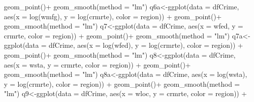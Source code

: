 \documentclass[]{article}
\newenvironment{Shaded}{}{}
\newcommand{\DataTypeTok}[1]{#1}
\newcommand{\KeywordTok}[1]{\textcolor[rgb]{0.00,0.00,1.00}{#1}}
\newcommand{\NormalTok}[1]{#1}
\newcommand{\OperatorTok}[1]{#1}
\newcommand{\StringTok}[1]{\textcolor[rgb]{0.00,0.50,0.50}{#1}}
\begin{document}
\begin{Shaded}
\begin{Highlighting}[]
\StringTok{      }\KeywordTok{geom_point}\NormalTok{()}\OperatorTok{+}
\StringTok{  }\KeywordTok{geom_smooth}\NormalTok{(}\DataTypeTok{method =} \StringTok{"lm"}\NormalTok{)}
\NormalTok{q6a<-}\KeywordTok{ggplot}\NormalTok{(}\DataTypeTok{data =}\NormalTok{ dfCrime, }\KeywordTok{aes}\NormalTok{(}\DataTypeTok{x =} \KeywordTok{log}\NormalTok{(wmfg), }\DataTypeTok{y =} \KeywordTok{log}\NormalTok{(crmrte), }\DataTypeTok{color =}\NormalTok{ region)) }\OperatorTok{+}\StringTok{ }
\StringTok{      }\KeywordTok{geom_point}\NormalTok{()}\OperatorTok{+}
\StringTok{  }\KeywordTok{geom_smooth}\NormalTok{(}\DataTypeTok{method =} \StringTok{"lm"}\NormalTok{)}
\NormalTok{q7<-}\KeywordTok{ggplot}\NormalTok{(}\DataTypeTok{data =}\NormalTok{ dfCrime, }\KeywordTok{aes}\NormalTok{(}\DataTypeTok{x =}\NormalTok{ wfed, }\DataTypeTok{y =}\NormalTok{ crmrte, }\DataTypeTok{color =}\NormalTok{ region)) }\OperatorTok{+}\StringTok{ }
\StringTok{      }\KeywordTok{geom_point}\NormalTok{()}\OperatorTok{+}
\StringTok{  }\KeywordTok{geom_smooth}\NormalTok{(}\DataTypeTok{method =} \StringTok{"lm"}\NormalTok{)}
\NormalTok{q7a<-}\KeywordTok{ggplot}\NormalTok{(}\DataTypeTok{data =}\NormalTok{ dfCrime, }\KeywordTok{aes}\NormalTok{(}\DataTypeTok{x =} \KeywordTok{log}\NormalTok{(wfed), }\DataTypeTok{y =} \KeywordTok{log}\NormalTok{(crmrte), }\DataTypeTok{color =}\NormalTok{ region)) }\OperatorTok{+}\StringTok{ }
\StringTok{      }\KeywordTok{geom_point}\NormalTok{()}\OperatorTok{+}
\StringTok{  }\KeywordTok{geom_smooth}\NormalTok{(}\DataTypeTok{method =} \StringTok{"lm"}\NormalTok{)}
\NormalTok{q8<-}\KeywordTok{ggplot}\NormalTok{(}\DataTypeTok{data =}\NormalTok{ dfCrime, }\KeywordTok{aes}\NormalTok{(}\DataTypeTok{x =}\NormalTok{ wsta, }\DataTypeTok{y =}\NormalTok{ crmrte, }\DataTypeTok{color =}\NormalTok{ region)) }\OperatorTok{+}\StringTok{ }
\StringTok{      }\KeywordTok{geom_point}\NormalTok{()}\OperatorTok{+}
\StringTok{  }\KeywordTok{geom_smooth}\NormalTok{(}\DataTypeTok{method =} \StringTok{"lm"}\NormalTok{)}
\NormalTok{q8a<-}\KeywordTok{ggplot}\NormalTok{(}\DataTypeTok{data =}\NormalTok{ dfCrime, }\KeywordTok{aes}\NormalTok{(}\DataTypeTok{x =} \KeywordTok{log}\NormalTok{(wsta), }\DataTypeTok{y =} \KeywordTok{log}\NormalTok{(crmrte), }\DataTypeTok{color =}\NormalTok{ region)) }\OperatorTok{+}\StringTok{ }
\StringTok{      }\KeywordTok{geom_point}\NormalTok{()}\OperatorTok{+}
\StringTok{  }\KeywordTok{geom_smooth}\NormalTok{(}\DataTypeTok{method =} \StringTok{"lm"}\NormalTok{)}
\NormalTok{q9<-}\KeywordTok{ggplot}\NormalTok{(}\DataTypeTok{data =}\NormalTok{ dfCrime, }\KeywordTok{aes}\NormalTok{(}\DataTypeTok{x =}\NormalTok{ wloc, }\DataTypeTok{y =}\NormalTok{ crmrte, }\DataTypeTok{color =}\NormalTok{ region)) }\OperatorTok{+}\StringTok{ }

\end{Highlighting}
\end{Shaded}
\end{document}
